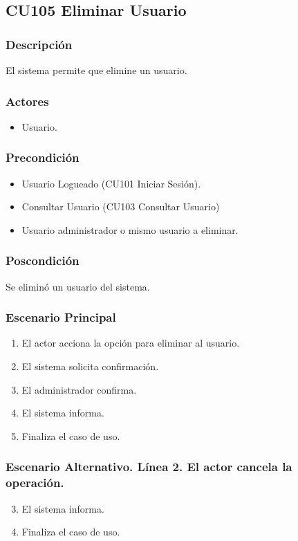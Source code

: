 \subsection{CU105 Eliminar Usuario}
\subsubsection{Descripci\'{o}n}
El sistema permite que elimine un usuario.
\subsubsection{Actores}
\begin{itemize}
\item Usuario.
\end{itemize}
\subsubsection{Precondici\'{o}n}
\begin{itemize}
\item Usuario Logueado (CU101 Iniciar Sesi\'{o}n).
\item Consultar Usuario (CU103 Consultar Usuario)
\item Usuario administrador o mismo usuario a eliminar.
\end{itemize}
\subsubsection{Poscondici\'{o}n}
Se elimin\'{o} un usuario del sistema.
\subsubsection{Escenario Principal}
\begin{enumerate}
\item El actor acciona la opci\'{o}n para eliminar al usuario.
\item El sistema solicita confirmaci\'{o}n.
\item El administrador confirma.
\item El sistema informa.
\item Finaliza el caso de uso.
\end{enumerate}
\subsubsection{Escenario Alternativo. L\'{i}nea 2. El actor cancela la operaci\'{o}n.}
\begin{enumerate}
\setcounter{enumi}{2}
\item El sistema informa.
\item Finaliza el caso de uso.
\end{enumerate}
